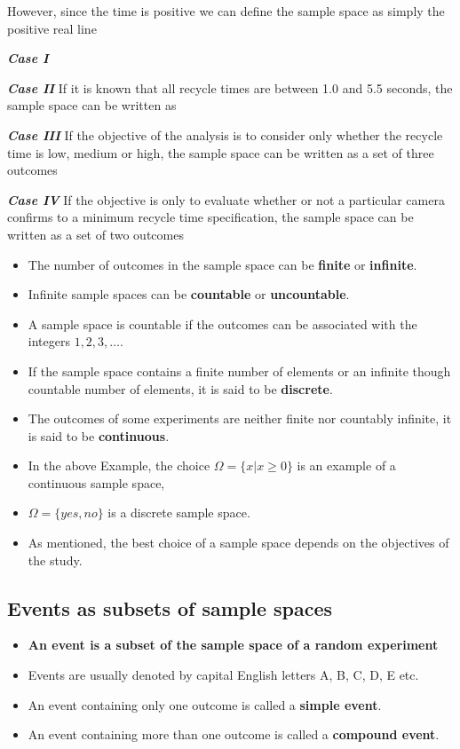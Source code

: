 \documentclass[]{book}
\providecommand{\tightlist}{%
  \setlength{\itemsep}{0pt}\setlength{\parskip}{0pt}}
\begin{document}
However, since the time is positive we can define the sample space as simply the positive real line

\textbf{\emph{Case I}}

\textbf{\emph{Case II}} If it is known that all recycle times are between 1.0 and 5.5 seconds, the sample space can be written as

\textbf{\emph{Case III}} If the objective of the analysis is to consider only whether the recycle time is low, medium or high, the sample space can be written as a set of three outcomes

\textbf{\emph{Case IV}} If the objective is only to evaluate whether or not a particular camera confirms to a minimum recycle time specification, the sample space can be written as a set of two outcomes

\begin{itemize}
\tightlist
\item
  The number of outcomes in the sample space can be \textbf{finite} or \textbf{infinite}.
\item
  Infinite sample spaces can be \textbf{countable} or \textbf{uncountable}.
\item
  A sample space is countable if the outcomes can be associated with the integers \(1, 2,3,\dots\).
\item
  If the sample space contains a finite number of elements or an infinite though countable number of elements, it is said to be \textbf{discrete}.
\item
  The outcomes of some experiments are neither finite nor countably infinite, it is said to be \textbf{continuous}.\\
\item
  In the above Example, the choice \(\Omega = \{x | x \geq 0\}\) is an example of a continuous sample space,
\item
  \(\Omega = \{yes, no\}\) is a discrete sample space.
\item
  As mentioned, the best choice of a sample space depends on the objectives of the study.
\end{itemize}

\hypertarget{events-as-subsets-of-sample-spaces}{%
\subsection{Events as subsets of sample spaces}\label{events-as-subsets-of-sample-spaces}}

\begin{itemize}
\tightlist
\item
  \textbf{An event is a subset of the sample space of a random experiment}
\item
  Events are usually denoted by capital English letters A, B, C, D, E etc.
\item
  An event containing only one outcome is called a \textbf{simple event}.
\item
  An event containing more than one outcome is called a \textbf{compound event}.
\end{itemize}
\end{document}
